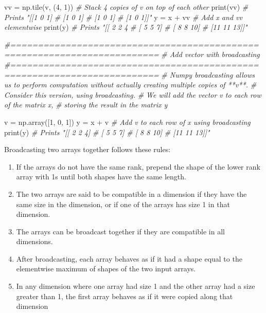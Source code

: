 \documentclass[
]{article}
\newenvironment{Shaded}{}{}
\newcommand{\BuiltInTok}[1]{#1}
\newcommand{\CommentTok}[1]{\textcolor[rgb]{0.38,0.63,0.69}{\textit{#1}}}
\newcommand{\DecValTok}[1]{\textcolor[rgb]{0.25,0.63,0.44}{#1}}
\newcommand{\NormalTok}[1]{#1}
\newcommand{\OperatorTok}[1]{\textcolor[rgb]{0.40,0.40,0.40}{#1}}
\begin{document}
\begin{Shaded}
\begin{Highlighting}[]
\NormalTok{vv }\OperatorTok{=}\NormalTok{ np.tile(v, (}\DecValTok{4}\NormalTok{, }\DecValTok{1}\NormalTok{))   }\CommentTok{\# Stack 4 copies of v on top of each other}
\BuiltInTok{print}\NormalTok{(vv)                 }\CommentTok{\# Prints "[[1 0 1]}
                          \CommentTok{\#          [1 0 1]}
                          \CommentTok{\#          [1 0 1]}
                          \CommentTok{\#          [1 0 1]]"}
\NormalTok{y }\OperatorTok{=}\NormalTok{ x }\OperatorTok{+}\NormalTok{ vv  }\CommentTok{\# Add x and vv elementwise}
\BuiltInTok{print}\NormalTok{(y)  }\CommentTok{\# Prints "[[ 2  2  4}
          \CommentTok{\#          [ 5  5  7]}
          \CommentTok{\#          [ 8  8 10]}
          \CommentTok{\#          [11 11 13]]"}
            

\CommentTok{\#=========================================================================}
\CommentTok{\# Add vector with broadcasting}
\CommentTok{\#=========================================================================}
\CommentTok{\# Numpy broadcasting allows us to perform computation without actually creating multiple copies of **\textasciigrave{}v\textasciigrave{}**. }
\CommentTok{\# Consider this version, using broadcasting.}
\CommentTok{\# We will add the vector v to each row of the matrix x,}
\CommentTok{\# storing the result in the matrix y}

\NormalTok{v }\OperatorTok{=}\NormalTok{ np.array([}\DecValTok{1}\NormalTok{, }\DecValTok{0}\NormalTok{, }\DecValTok{1}\NormalTok{])}
\NormalTok{y }\OperatorTok{=}\NormalTok{ x }\OperatorTok{+}\NormalTok{ v  }\CommentTok{\# Add v to each row of x using broadcasting}
\BuiltInTok{print}\NormalTok{(y)  }\CommentTok{\# Prints "[[ 2  2  4]}
          \CommentTok{\#          [ 5  5  7]}
          \CommentTok{\#          [ 8  8 10]}
          \CommentTok{\#          [11 11 13]]"}
            
\end{Highlighting}
\end{Shaded}

Broadcasting two arrays together follows these rules:

\begin{enumerate}
\def\labelenumi{\arabic{enumi}.}
\item
  If the arrays do not have the same rank, prepend the shape of the
  lower rank array with 1s until both shapes have the same length.
\item
  The two arrays are said to be compatible in a dimension if they have
  the same size in the dimension, or if one of the arrays has size 1 in
  that dimension.
\item
  The arrays can be broadcast together if they are compatible in all
  dimensions.
\item
  After broadcasting, each array behaves as if it had a shape equal to
  the elementwise maximum of shapes of the two input arrays.
\item
  In any dimension where one array had size 1 and the other array had a
  size greater than 1, the first array behaves as if it were copied
  along that dimension
\end{enumerate}
\end{document}
